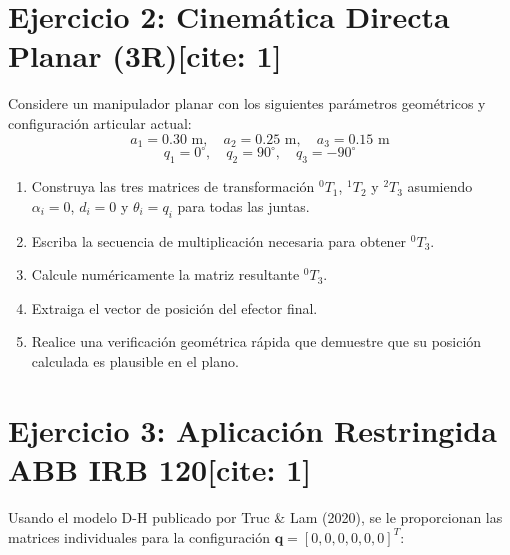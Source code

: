 \documentclass[11pt, a4paper]{article}
\begin{document}
\section*{Ejercicio 2: Cinemática Directa Planar (3R)[cite: 1]}
Considere un manipulador planar con los siguientes parámetros geométricos y configuración articular actual:
\begin{equation*}
    a_1 = 0.30\text{ m}, \quad a_2 = 0.25\text{ m}, \quad a_3 = 0.15\text{ m}
\end{equation*}
\begin{equation*}
    q_1 = 0^\circ, \quad q_2 = 90^\circ, \quad q_3 = -90^\circ
\end{equation*}
\begin{enumerate}
    \item Construya las tres matrices de transformación ${}^{0}T_1$, ${}^{1}T_2$ y ${}^{2}T_3$ asumiendo $\alpha_i = 0$, $d_i = 0$ y $\theta_i = q_i$ para todas las juntas.
    \item Escriba la secuencia de multiplicación necesaria para obtener ${}^{0}T_3$.
    \item Calcule numéricamente la matriz resultante ${}^{0}T_3$.
    \item Extraiga el vector de posición del efector final.
    \item Realice una verificación geométrica rápida que demuestre que su posición calculada es plausible en el plano.
\end{enumerate}

\section*{Ejercicio 3: Aplicación Restringida ABB IRB 120[cite: 1]}
Usando el modelo D-H publicado por Truc \& Lam (2020), se le proporcionan las matrices individuales para la configuración $\mathbf{q} = [0, 0, 0, 0, 0, 0]^T$:
\end{document}
